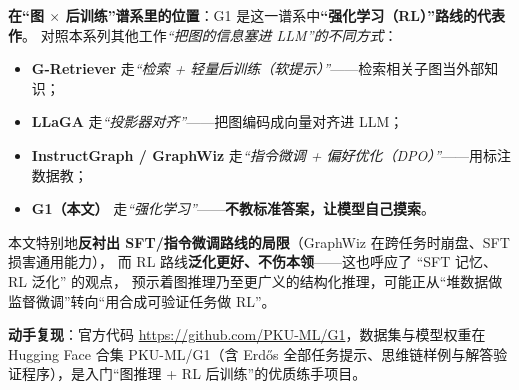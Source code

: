 \documentclass[11pt,UTF8,fontset=fandol]{ctexart}
\begin{document}
\textbf{在“图 $\times$ 后训练”谱系里的位置}：G1 是这一谱系中\textbf{“强化学习（RL）”路线的代表作}。
对照本系列其他工作\emph{“把图的信息塞进 LLM”的不同方式}：
\begin{itemize}[leftmargin=2em]
  \item \textbf{G-Retriever} 走\emph{“检索 + 轻量后训练（软提示）”}——检索相关子图当外部知识；
  \item \textbf{LLaGA} 走\emph{“投影器对齐”}——把图编码成向量对齐进 LLM；
  \item \textbf{InstructGraph / GraphWiz} 走\emph{“指令微调 + 偏好优化（DPO）”}——用标注数据教；
  \item \textbf{G1（本文）} 走\emph{“强化学习”}——\textbf{不教标准答案，让模型自己摸索}。
\end{itemize}
本文特别地\textbf{反衬出 SFT/指令微调路线的局限}（GraphWiz 在跨任务时崩盘、SFT 损害通用能力），
而 RL 路线\textbf{泛化更好、不伤本领}——这也呼应了 “SFT 记忆、RL 泛化” 的观点，
预示着图推理乃至更广义的结构化推理，可能正从“堆数据做监督微调”转向“用合成可验证任务做 RL”。

\textbf{动手复现}：官方代码 \url{https://github.com/PKU-ML/G1}，数据集与模型权重在 Hugging Face 合集
PKU-ML/G1（含 Erdős 全部任务提示、思维链样例与解答验证程序），是入门“图推理 + RL 后训练”的优质练手项目。
\end{document}
